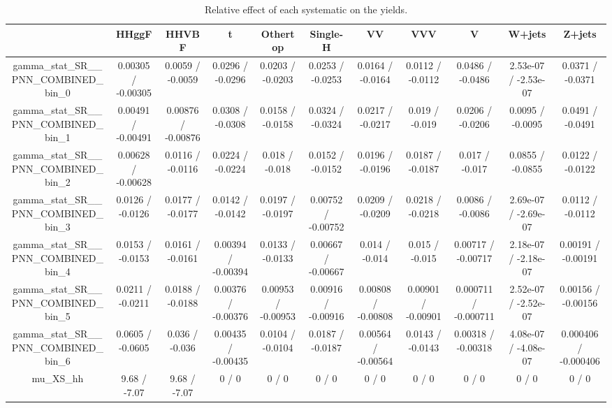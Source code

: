 \documentclass[10pt]{article}
\begin{document}
\begin{table}[htbp]
\begin{center}
\begin{tabular}{|c|c|c|c|c|c|c|c|c|c|c|}
\hline 
      & HHggF      & HHVBF      & t      & Othertop      & Single-H      & VV      & VVV      & V      & W+jets      & Z+jets \\ 
\hline 
  gamma_stat_SR__PNN_COMBINED_bin_0 & 0.00305 / -0.00305 & 0.0059 / -0.0059 & 0.0296 / -0.0296 & 0.0203 / -0.0203 & 0.0253 / -0.0253 & 0.0164 / -0.0164 & 0.0112 / -0.0112 & 0.0486 / -0.0486 & 2.53e-07 / -2.53e-07 & 0.0371 / -0.0371 \\ 
  gamma_stat_SR__PNN_COMBINED_bin_1 & 0.00491 / -0.00491 & 0.00876 / -0.00876 & 0.0308 / -0.0308 & 0.0158 / -0.0158 & 0.0324 / -0.0324 & 0.0217 / -0.0217 & 0.019 / -0.019 & 0.0206 / -0.0206 & 0.0095 / -0.0095 & 0.0491 / -0.0491 \\ 
  gamma_stat_SR__PNN_COMBINED_bin_2 & 0.00628 / -0.00628 & 0.0116 / -0.0116 & 0.0224 / -0.0224 & 0.018 / -0.018 & 0.0152 / -0.0152 & 0.0196 / -0.0196 & 0.0187 / -0.0187 & 0.017 / -0.017 & 0.0855 / -0.0855 & 0.0122 / -0.0122 \\ 
  gamma_stat_SR__PNN_COMBINED_bin_3 & 0.0126 / -0.0126 & 0.0177 / -0.0177 & 0.0142 / -0.0142 & 0.0197 / -0.0197 & 0.00752 / -0.00752 & 0.0209 / -0.0209 & 0.0218 / -0.0218 & 0.0086 / -0.0086 & 2.69e-07 / -2.69e-07 & 0.0112 / -0.0112 \\ 
  gamma_stat_SR__PNN_COMBINED_bin_4 & 0.0153 / -0.0153 & 0.0161 / -0.0161 & 0.00394 / -0.00394 & 0.0133 / -0.0133 & 0.00667 / -0.00667 & 0.014 / -0.014 & 0.015 / -0.015 & 0.00717 / -0.00717 & 2.18e-07 / -2.18e-07 & 0.00191 / -0.00191 \\ 
  gamma_stat_SR__PNN_COMBINED_bin_5 & 0.0211 / -0.0211 & 0.0188 / -0.0188 & 0.00376 / -0.00376 & 0.00953 / -0.00953 & 0.00916 / -0.00916 & 0.00808 / -0.00808 & 0.00901 / -0.00901 & 0.000711 / -0.000711 & 2.52e-07 / -2.52e-07 & 0.00156 / -0.00156 \\ 
  gamma_stat_SR__PNN_COMBINED_bin_6 & 0.0605 / -0.0605 & 0.036 / -0.036 & 0.00435 / -0.00435 & 0.0104 / -0.0104 & 0.0187 / -0.0187 & 0.00564 / -0.00564 & 0.0143 / -0.0143 & 0.00318 / -0.00318 & 4.08e-07 / -4.08e-07 & 0.000406 / -0.000406 \\ 
  mu_XS_hh & 9.68 / -7.07 & 9.68 / -7.07 & 0 / 0 & 0 / 0 & 0 / 0 & 0 / 0 & 0 / 0 & 0 / 0 & 0 / 0 & 0 / 0 \\ 
\hline 
\end{tabular} 
\caption{Relative effect of each systematic on the yields.} 
\end{center} 
\end{table} 
\end{document}
